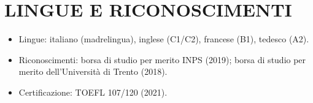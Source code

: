 \documentclass[11pt,a4paper]{article}
\renewcommand{\textbf}[1]{#1}
\begin{document}
\section*{LINGUE E RICONOSCIMENTI}
\begin{itemize}
\item \textbf{Lingue:} italiano (madrelingua), inglese (C1/C2), francese (B1), tedesco (A2).
\item \textbf{Riconoscimenti:} borsa di studio per merito INPS (2019); borsa di studio per merito dell'Università di Trento (2018).
\item \textbf{Certificazione:} TOEFL 107/120 (2021).
\end{itemize}
\end{document}
